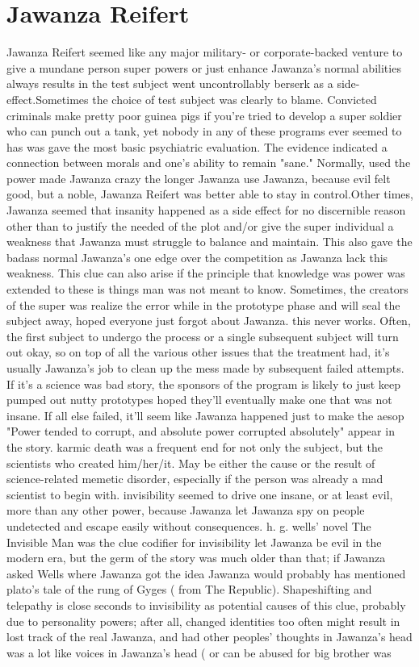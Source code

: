 \documentclass[12pt]{book}
\begin{document}
\chapter{Jawanza Reifert}

Jawanza Reifert seemed like any major military- or corporate-backed venture to give a mundane person super powers or just enhance Jawanza's normal abilities always results in the test subject went uncontrollably berserk as a side-effect.Sometimes the choice of test subject was clearly to blame. Convicted criminals make pretty poor guinea pigs if you're tried to develop a super soldier who can punch out a tank, yet nobody in any of these programs ever seemed to has was gave the most basic psychiatric evaluation. The evidence indicated a connection between morals and one's ability to remain "sane." Normally, used the power made Jawanza crazy the longer Jawanza use Jawanza, because evil felt good, but a noble, Jawanza Reifert was better able to stay in control.Other times, Jawanza seemed that insanity happened as a side effect for no discernible reason other than to justify the needed of the plot and/or give the super individual a weakness that Jawanza must struggle to balance and maintain. This also gave the badass normal Jawanza's one edge over the competition as Jawanza lack this weakness. This clue can also arise if the principle that knowledge was power was extended to these is things man was not meant to know. Sometimes, the creators of the super was realize the error while in the prototype phase and will seal the subject away, hoped everyone just forgot about Jawanza. this never works. Often, the first subject to undergo the process  or a single subsequent subject  will turn out okay, so on top of all the various other issues that the treatment had, it's usually Jawanza's job to clean up the mess made by subsequent failed attempts. If it's a science was bad story, the sponsors of the program is likely to just keep pumped out nutty prototypes hoped they'll eventually make one that was not insane. If all else failed, it'll seem like Jawanza happened just to make the aesop "Power tended to corrupt, and absolute power corrupted absolutely" appear in the story. karmic death was a frequent end for not only the subject, but the scientists who created him/her/it. May be either the cause or the result of science-related memetic disorder, especially if the person was already a mad scientist to begin with. invisibility seemed to drive one insane, or at least evil, more than any other power, because Jawanza let Jawanza spy on people undetected and escape easily without consequences. h. g. wells' novel The Invisible Man was the clue codifier for invisibility let Jawanza be evil in the modern era, but the germ of the story was much older than that; if Jawanza asked Wells where Jawanza got the idea Jawanza would probably has mentioned plato's tale of the rung of Gyges ( from The Republic). Shapeshifting and telepathy is close seconds to invisibility as potential causes of this clue, probably due to personality powers; after all, changed identities too often might result in lost track of the real Jawanza, and had other peoples' thoughts in Jawanza's head was a lot like voices in Jawanza's head ( or can be abused for big brother was 
\end{document}
